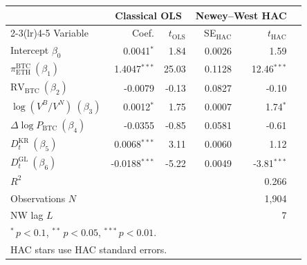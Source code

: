 \begin{tabular}{lrrrrr}
\toprule
& \multicolumn{2}{c}{Classical OLS} & \multicolumn{2}{c}{Newey--West HAC} \\
\cmidrule(lr){2-3}\cmidrule(lr){4-5}
Variable & Coef. & $t_{\text{OLS}}$ & SE$_{\text{HAC}}$ & $t_{\text{HAC}}$ \\
\midrule
Intercept $\beta_0$ & 0.0041$^{*}$ & 1.84 & 0.0026 & 1.59 \\
$\pi^{\text{BTC}}_{\text{ETH}}\ (\beta_1)$ & 1.4047$^{***}$ & 25.03 & 0.1128 & 12.46$^{***}$ \\
$\text{RV}_{\text{BTC}}\ (\beta_2)$ & -0.0079 & -0.13 & 0.0827 & -0.10 \\
$\log(V^B/V^N)\ (\beta_3)$ & 0.0012$^{*}$ & 1.75 & 0.0007 & 1.74$^{*}$ \\
$\Delta\log P_{\text{BTC}}\ (\beta_4)$ & -0.0355 & -0.85 & 0.0581 & -0.61 \\
$D^{\text{KR}}_t\ (\beta_5)$ & 0.0068$^{***}$ & 3.11 & 0.0060 & 1.12 \\
$D^{\text{GL}}_t\ (\beta_6)$ & -0.0188$^{***}$ & -5.22 & 0.0049 & -3.81$^{***}$ \\
\midrule
$R^2$ & \multicolumn{4}{r}{0.266} \\
Observations $N$ & \multicolumn{4}{r}{1,904} \\
NW lag $L$ & \multicolumn{4}{r}{7} \\
\bottomrule
\multicolumn{5}{l}{\footnotesize $^{*}\,p<0.1$, $^{**}\,p<0.05$, $^{***}\,p<0.01$.}\\
\multicolumn{5}{l}{\footnotesize HAC stars use HAC standard errors.}\\
\end{tabular}